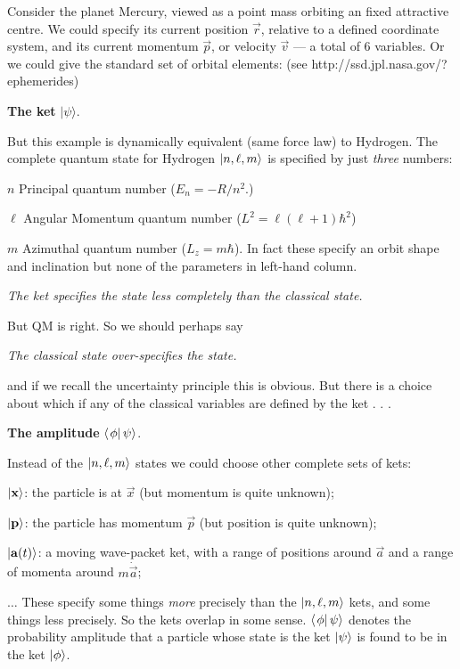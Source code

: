 \noi Consider the planet Mercury, viewed as a point mass orbiting an
fixed attractive centre. We could specify its current position $\Vec r$, relative to a
defined coordinate system, and its current momentum $\Vec p$, or 
velocity $\Vec v$ --- a total of 6 variables. Or we could give the standard set
of orbital elements: (see http://ssd.jpl.nasa.gov/?ephemerides)
\vfil\noi
\centerline{\vbox{}}
\vfil\Eject
{}
\centerline{{\bf The ket} $|\psi\rangle$.}
\noi But this example is dynamically equivalent (same force law) to Hydrogen. The
complete quantum state for Hydrogen $\left| {n,\ell,m} \right>$ is specified by just {\it three} numbers:
\medskip
\item{$n$} Principal quantum number ($E_n=-R/n^2$.)
\item{$\ell$} Angular Momentum quantum number ($L^2=\ell(\ell+1)\hbar^2$)
\item{$m$} Azimuthal quantum number ($L_z=m\hbar$).
\medskip\noi
In fact these specify an orbit shape and inclination but none of the
parameters in left-hand column.
\medskip
\centerline{\it The ket specifies the state less completely than the classical
state.}
\medskip\noi
But QM is right. So we should perhaps say
\medskip
\centerline{\it The classical state over-specifies the state.}
\medskip\noi
and if we recall the uncertainty principle this is obvious.
\vfil
\noi
But there is a choice about which if any of the classical variables are
defined by the ket . . .
\vfil\Eject
{}
\centerline{{\bf The amplitude} $\left< \left. {\phi} \right| {\psi} \right>$.}
\noi
Instead of the $\left| {n,\ell,m} \right>$ states we could choose other complete sets of
kets:
\medskip\item{}$\left| {{\bf x}} \right>$: the particle is at $\Vec x$ (but momentum is
quite unknown);
\smallskip\item{}$\left| {{\bf p}} \right>$: the particle has momentum $\Vec p$ (but position
is quite unknown);
\smallskip\item{}$\left| {{\bf a}(t)} \right>$: a moving wave-packet ket, with a range
of positions around $\Vec a$ and a range of momenta around $m\dot\Vec a$;
\smallskip\item{}$\ldots$\medskip\noi
These specify some things {\it more} precisely than the $\left| {n,\ell,m} \right>$ kets,
and some things less precisely. So the kets overlap in some sense. 
\smallskip\noi
$\left< \left. {\phi} \right| {\psi} \right>$ denotes the probability amplitude that a particle whose
state is the ket $\left| {\psi} \right>$ is found to be in the ket $\left| {\phi} \right>$.
\vfil\Eject
{}

